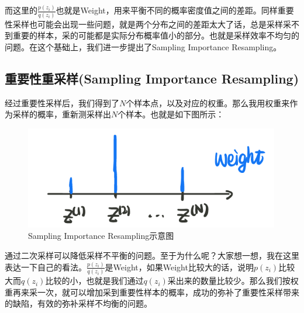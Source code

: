 \documentclass[a4paper]{article}
\begin{document}
而这里的$\frac{p(z_i)}{q(z_i)}$也就是Weight，用来平衡不同的概率密度值之间的差距。同样重要性采样也可能会出现一些问题，就是两个分布之间的差距太大了话，总是采样采不到重要的样本，采的可能都是实际分布概率值小的部分。也就是采样效率不均匀的问题。在这个基础上，我们进一步提出了Sampling Importance Resampling。

\subsection{重要性重采样(Sampling Importance Resampling)}
经过重要性采样后，我们得到了$N$个样本点，以及对应的权重。那么我用权重来作为采样的概率，重新测采样出$N$个样本。也就是如下图所示：
\begin{figure}[H]
    \centering
    \includegraphics[width=.5\textwidth]{微信图片_20191230154011.png}
    \caption{Sampling Importance Resampling示意图}
    \label{fig:my_label_1}
\end{figure}

通过二次采样可以降低采样不平衡的问题。至于为什么呢？大家想一想，我在这里表达一下自己的看法。$\frac{p(z_i)}{q(z_i)}$是Weight，如果Weight比较大的话，说明$p(z_i)$比较大而$q(z_i)$比较的小，也就是我们通过$q(z_i)$采出来的数量比较少。那么我们按权重再来采一次，就可以增加采到重要性样本的概率，成功的弥补了重要性采样带来的缺陷，有效的弥补采样不均衡的问题。
\end{document}
